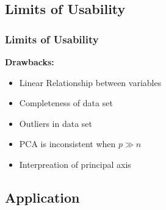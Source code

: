 \documentclass{beamer}
\theoremstyle{plain}
\theoremstyle{definition}
\begin{document}
\subsection{Limits of Usability}
\begin{frame}
\frametitle{Limits of Usability}
\textbf{Drawbacks:}
\begin{itemize}
\item Linear Relationship between variables
\item Completeness of data set
\item Outliers in data set
\item PCA is inconsistent when $p \gg n$
\item Interpreation of principal axis
\end{itemize}


\end{frame}


\subsection{Application}
\end{document}
